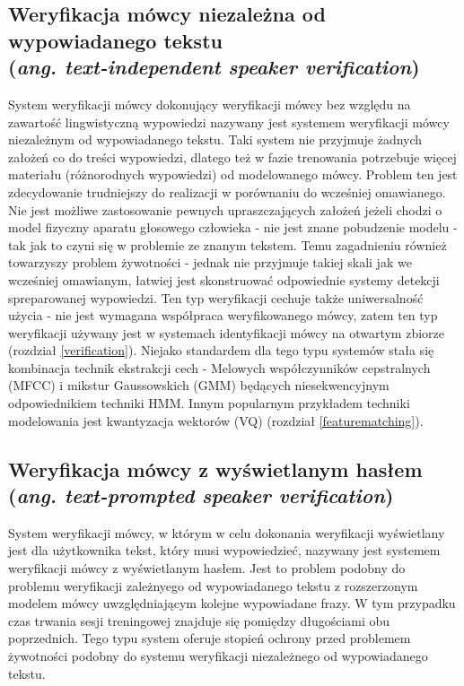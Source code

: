 \subsection{Weryfikacja mówcy niezależna od wypowiadanego tekstu \\ (\textit{ang. text-independent speaker verification})}
System weryfikacji mówcy dokonujący weryfikacji mówcy bez względu na zawartość lingwistyczną wypowiedzi nazywany jest systemem weryfikacji mówcy niezależnym od wypowiadanego tekstu. Taki system nie przyjmuje żadnych założeń co do treści wypowiedzi, dlatego też w fazie trenowania potrzebuje więcej materiału (różnorodnych wypowiedzi) od modelowanego mówcy. Problem ten jest zdecydowanie trudniejszy do realizacji w porównaniu do wcześniej omawianego. Nie jest możliwe zastosowanie pewnych upraszczających założeń jeżeli chodzi o model fizyczny aparatu głosowego człowieka - nie jest znane pobudzenie modelu - tak jak to czyni się w problemie ze znanym tekstem. Temu zagadnieniu również towarzyszy problem żywotności - jednak nie przyjmuje takiej skali jak we wcześniej omawianym, łatwiej jest skonstruować odpowiednie systemy detekcji spreparowanej wypowiedzi. Ten typ weryfikacji cechuje także uniwersalność użycia - nie jest wymagana współpraca weryfikowanego mówcy, zatem ten typ weryfikacji używany jest w systemach identyfikacji mówcy na otwartym zbiorze (rozdział \ref{verification}). Niejako standardem dla tego typu systemów stała się kombinacja technik ekstrakcji cech - Melowych współczynników cepstralnych (MFCC) i mikstur Gaussowskich (GMM) będących niesekwencyjnym odpowiednikiem techniki HMM. Innym popularnym przykładem techniki modelowania jest kwantyzacja wektorów (VQ) (rozdział \ref{featurematching}). 

\subsection{Weryfikacja mówcy z wyświetlanym hasłem \\ (\textit{ang. text-prompted speaker verification})}
\label{prompted}
System weryfikacji mówcy, w którym w celu dokonania weryfikacji wyświetlany jest dla użytkownika tekst, który musi wypowiedzieć, nazywany jest systemem weryfikacji mówcy z wyświetlanym hasłem. Jest to problem podobny do problemu weryfikacji zależnyego od wypowiadanego tekstu z rozszerzonym modelem mówcy uwzględniającym kolejne wypowiadane frazy. W tym przypadku czas trwania sesji treningowej znajduje się pomiędzy długościami obu poprzednich. Tego typu system oferuje stopień
ochrony przed problemem żywotności podobny do systemu weryfikacji niezależnego od wypowiadanego tekstu. 

